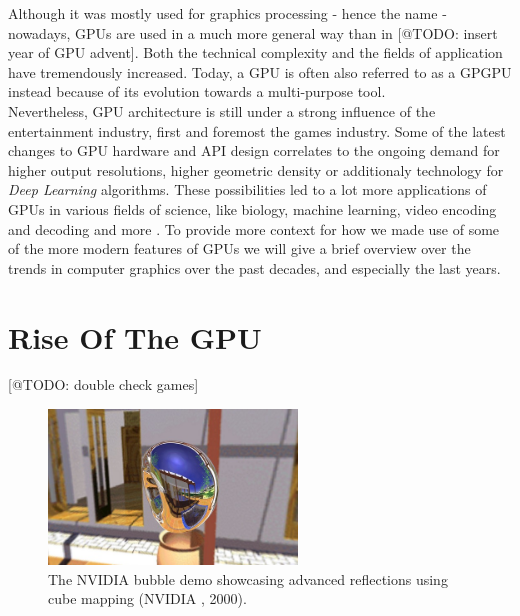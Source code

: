 \noindent
Although it was mostly used for graphics processing - hence the name - nowadays, \ac{GPU}s
are used in a much more general way than in [@TODO: insert year of GPU advent]. Both the 
technical complexity and the fields of application have tremendously increased. Today, a 
\ac{GPU} is often also referred to as a \ac{GPGPU} instead because of its evolution towards 
a multi-purpose tool. \\

\noindent
Nevertheless, \ac{GPU} architecture is still under a strong influence of the entertainment 
industry, first and foremost the games industry. Some of the latest changes to \ac{GPU} 
hardware and \ac{API} design correlates to the ongoing demand for higher output resolutions, 
higher geometric density or additionaly technology for \emph{Deep Learning} algorithms. 
These possibilities led to a lot more applications of \ac{GPU}s in various fields of science, 
like biology, machine learning, video encoding and decoding and more \cite{Battaglia2024}.
To provide more context for how we made use of some of the more modern features of \ac{GPU}s 
we will give a brief overview over the trends in computer graphics over the past decades, and 
especially the last years.


\section{Rise Of The GPU} \label{sec-rise-of-the-gpu}

[@TODO: double check games]

\begin{figure}[h]
    \centering
    \includegraphics[width=250px]{images/graphics/bubble-reflection-effects-demo.jpg}
    \caption{The NVIDIA bubble demo showcasing advanced reflections using cube mapping (NVIDIA \cite{NVIDIABubble}, 2000).}
    \label{fig:bubble-reflection-demo}
\end{figure}

